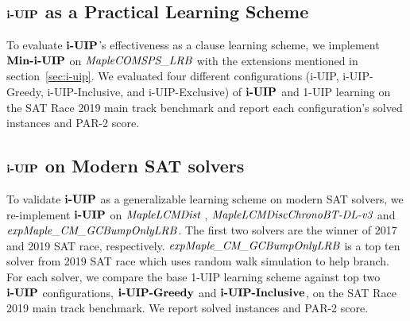 

\subsection{$\textbf{i-UIP}$ as a Practical Learning Scheme}
To evaluate $\textbf{i-UIP}$'s effectiveness as a clause learning scheme, we implement $\textbf{Min-i-UIP}$ on $\textit{MapleCOMSPS\_LRB}$ with the extensions mentioned in section~\ref{sec:i-uip}. We evaluated four different configurations (i-UIP, i-UIP-Greedy, i-UIP-Inclusive, and i-UIP-Exclusive) of $\textbf{i-UIP}$ and 1-UIP learning on the SAT Race 2019 main track benchmark and report each configuration's solved instances and PAR-2 score. 



\subsection{$\textbf{i-UIP}$ on Modern SAT solvers}
To validate $\textbf{i-UIP}$ as a generalizable learning scheme on modern SAT solvers, we re-implement $\textbf{i-UIP}$ on $\textit{MapleLCMDist}$ \cite{},  $\textit{MapleLCMDiscChronoBT-DL-v3}$ \cite{} and $\textit{expMaple\_CM\_GCBumpOnlyLRB}$.  
The first two solvers are the winner of 2017 and 2019 SAT race, respectively.  $\textit{expMaple\_CM\_GCBumpOnlyLRB}$ is a top ten solver from 2019 SAT race which uses random walk simulation to help branch. For each solver, we compare the base 1-UIP learning scheme against top two $\textbf{i-UIP}$ configurations, $\textbf{i-UIP-Greedy}$ and $\textbf{i-UIP-Inclusive}$, on the SAT Race 2019 main track benchmark. We report solved instances and PAR-2 score.

